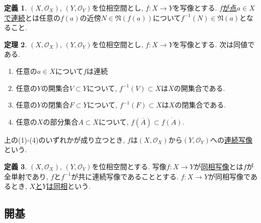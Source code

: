 \documentclass[dvipdfmx,a4paper,11pt]{article}
\theoremstyle{definition}
\newtheorem{thm}{定理}
\newtheorem{dfn}[thm]{定義}
\begin{document}
\begin{tcolorbox}[
    colback = white,
    colframe = green!35!black,
    fonttitle = \bfseries,
    breakable = true]
    \begin{dfn}
$(X, \mathscr{O}_X )$, $(Y, \mathscr{O}_Y)$を位相空間とし, $f : X \rightarrow Y$を写像とする.
\underline{$f$が点$a \in X$で連続}とは任意の$f(a)$の近傍$N \in \mathfrak{N}(f(a))$について$f^{-1}(N) \in  \mathfrak{N}(a)$となること.
  \end{dfn}
 \end{tcolorbox}
 
 
    \begin{tcolorbox}[
    colback = white,
    colframe = green!35!black,
    fonttitle = \bfseries,
    breakable = true]
    \begin{thm}
    \text{}
$(X, \mathscr{O}_X )$, $(Y, \mathscr{O}_Y)$を位相空間とし, $f : X \rightarrow Y$を写像とする. 次は同値である.
    \begin{enumerate}
     \setlength{\parskip}{0cm} 
  \setlength{\itemsep}{0cm} 
    \item 任意の$a \in X$について$f$は連続
    \item 任意の$Y$の開集合$V \subset Y$について, $f^{-1}(V) \subset X$は$X$の開集合である.
    \item 任意の$Y$の閉集合$F \subset Y$について, $f^{-1}(F) \subset X$は$X$の閉集合である.
    \item 任意の$X$の部分集合$A \subset X$について, $f(\overline{A}) \subset \overline{f(A)}$.
    \end{enumerate}
   \end{thm}
 上の(1)-(4)のいずれかが成り立つとき, $f$は$(X, \mathscr{O}_X )$から$(Y, \mathscr{O}_Y)$への\underline{連続写像}という.
 \end{tcolorbox}
 
 \begin{tcolorbox}[
    colback = white,
    colframe = green!35!black,
    fonttitle = \bfseries,
    breakable = true]
    \begin{dfn}
$(X, \mathscr{O}_X )$, $(Y, \mathscr{O}_Y)$を位相空間とする. 写像$f : X \rightarrow Y$が\underline{同相写像}とは$f$が全単射であり, $f$と$f^{-1}$が共に連続写像であることとする.
$f : X \rightarrow Y$が同相写像であるとき, \underline{$X$と$Y$は同相}という.
  \end{dfn}
 \end{tcolorbox}
 
 \subsection{開基}
 
\end{document}

